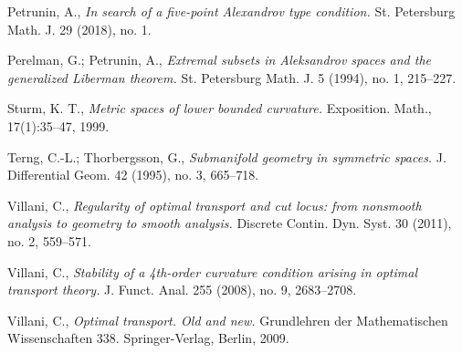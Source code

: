 \documentclass{article}
\begin{document}
\begin{thebibliography}{52}
 Petrunin, A., \emph{In search of a five-point Alexandrov type condition.}  St. Petersburg Math. J. 29 (2018), no. 1.

 Perelman, G.; Petrunin, A., \emph{Extremal subsets in Aleksandrov spaces and the generalized Liberman theorem.} St. Petersburg Math. J. 5 (1994), no. 1, 215--227.


  Sturm, K. T., \emph{Metric spaces of lower bounded curvature.} Exposition. Math., 17(1):35–47, 1999.


  Terng, C.-L.;  Thorbergsson, G.,
\emph{Submanifold geometry in symmetric spaces.} J. Differential Geom. 42 (1995), no. 3, 665--718.

 Villani, C., \emph{Regularity of optimal transport and cut locus: from nonsmooth analysis to geometry to smooth analysis.} Discrete Contin. Dyn. Syst. 30 (2011), no. 2, 559–571. 
 
 Villani, C., \emph{Stability of a 4th-order curvature condition arising in optimal transport theory.}
J. Funct. Anal. 255 (2008), no. 9, 2683--2708.

 
  Villani, C., \emph{Optimal transport. Old and new.} Grundlehren der Mathematischen Wissenschaften 338. Springer-Verlag, Berlin, 2009.
\end{thebibliography}


%
\Addresses
\end{document}
